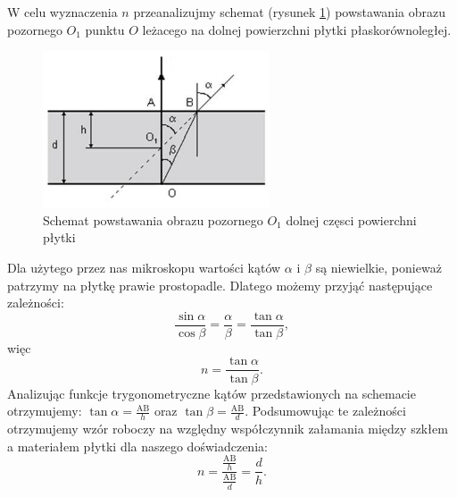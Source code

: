 \documentclass [a4paper,11pt]{article}
\begin{document}
	W celu wyznaczenia $n$ przeanalizujmy schemat (rysunek \ref{fig:schemat}) powstawania obrazu pozornego $O_1$ punktu $O$ leżacego na dolnej powierzchni płytki płaskorównoległej. 
	\begin{center}
	
			\begin{figure}[!h]
				\centering
				\includegraphics[width=0.6\textwidth]{schemat_zalamanie}
				\caption{Schemat powstawania obrazu pozornego $O_1$ dolnej częsci powierchni płytki }
				\label{fig:schemat}
		\end{figure}
	\end{center}
	
	Dla użytego przez nas mikroskopu wartości kątów $\alpha$ i $\beta$ są niewielkie, ponieważ patrzymy na płytkę prawie prostopadle. Dlatego możemy przyjąć następujące zależności:
	\begin{equation}
		\frac{\sin \alpha}{\cos \beta}=\frac{ \alpha}{ \beta}=\frac{\tan \alpha}{\tan \beta},
	\end{equation}
	więc
	\begin{equation}
		n=\frac{\tan \alpha}{\tan \beta}.
	\end{equation}
	Analizując funkcje trygonometryczne kątów przedstawionych na schemacie otrzymujemy:
	$\tan \alpha = \frac{\text{AB}}{h}$ oraz $\tan \beta = \frac{\text{AB}}{d}$.
	Podsumowując te zależności otrzymujemy wzór roboczy na względny współczynnik załamania między szkłem a materiałem płytki dla naszego doświadczenia:
	\begin{equation}
		n=\frac{\frac{\text{AB}}{h}}{\frac{\text{AB}}{d}}=\frac{d}{h}.
	\end{equation} 
	
	  	
		
\end{document}
